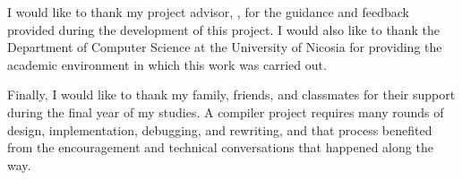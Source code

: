 \noindent I would like to thank my project advisor, \advisorname{}, for the
guidance and feedback provided during the development of this project. I would
also like to thank the Department of Computer Science at the University of
Nicosia for providing the academic environment in which this work was carried
out.

\noindent Finally, I would like to thank my family, friends, and classmates for
their support during the final year of my studies. A compiler project requires
many rounds of design, implementation, debugging, and rewriting, and that process
benefited from the encouragement and technical conversations that happened along
the way.
